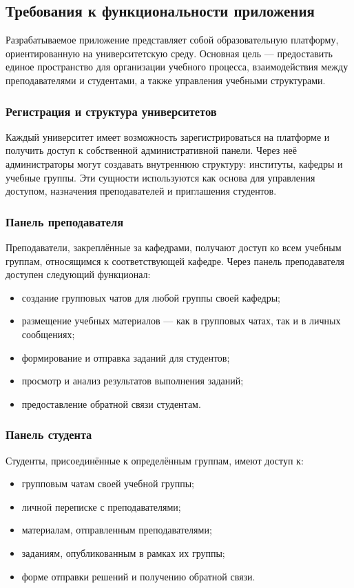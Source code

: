 \subsection{Требования к функциональности приложения}

Разрабатываемое приложение представляет собой образовательную платформу, ориентированную на университетскую среду. Основная цель — предоставить единое пространство для организации учебного процесса, взаимодействия между преподавателями и студентами, а также управления учебными структурами.

\subsubsection{Регистрация и структура университетов}
Каждый университет имеет возможность зарегистрироваться на платформе и получить доступ к собственной административной панели. Через неё администраторы могут создавать внутреннюю структуру: институты, кафедры и учебные группы. Эти сущности используются как основа для управления доступом, назначения преподавателей и приглашения студентов.

\subsubsection{Панель преподавателя}
Преподаватели, закреплённые за кафедрами, получают доступ ко всем учебным группам, относящимся к соответствующей кафедре. Через панель преподавателя доступен следующий функционал:
\begin{itemize}
  \item создание групповых чатов для любой группы своей кафедры;
  \item размещение учебных материалов — как в групповых чатах, так и в личных сообщениях;
  \item формирование и отправка заданий для студентов;
  \item просмотр и анализ результатов выполнения заданий;
  \item предоставление обратной связи студентам.
\end{itemize}

\subsubsection{Панель студента}
Студенты, присоединённые к определённым группам, имеют доступ к:

\begin{itemize}
  \item групповым чатам своей учебной группы;
  \item личной переписке с преподавателями;
  \item материалам, отправленным преподавателями;
  \item заданиям, опубликованным в рамках их группы;
  \item форме отправки решений и получению обратной связи.
\end{itemize}
